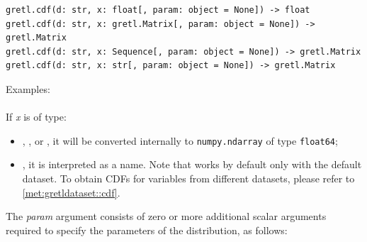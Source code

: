 \label{func:gretl.cdf}
\begin{lstlisting}[style=pythonstylefoot]
gretl.cdf(d: str, x: float[, param: object = None]) -> float
gretl.cdf(d: str, x: gretl.Matrix[, param: object = None]) -> gretl.Matrix
gretl.cdf(d: str, x: Sequence[, param: object = None]) -> gretl.Matrix
gretl.cdf(d: str, x: str[, param: object = None]) -> gretl.Matrix
\end{lstlisting}
Examples:\newline
{}\\
\\
If \textit{x} is of type:
\begin{itemize}
	\item {}, , or ,
	it will be converted internally to \texttt{numpy.ndarray}
	of type \texttt{float64};
	\item {}, it is interpreted as a  name.
	Note that  works by default only with the
	default dataset. To obtain CDFs for variables from different
	datasets, please refer to \ref{met:gretldataset::cdf}.
\end{itemize}
The \textit{param} argument consists of zero or more additional scalar
arguments required to specify the parameters of the distribution, as
follows:
